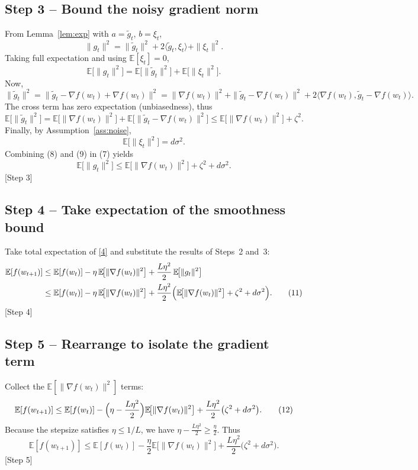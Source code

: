 \documentclass{article}
\newcommand{\E}{\mathbb{E}}
\begin{document}
\subsection*{Step 3 – Bound the noisy gradient norm}
From Lemma~\ref{lem:exp} with $a=\tilde g_t$, $b=\xi_t$,
\[
\|g_t\|^2 = \|\tilde g_t\|^2 + 2\langle\tilde g_t,\xi_t\rangle +\|\xi_t\|^2 .
\] 
Taking full expectation and using $\E[\xi_t]=0$,
\[
\E\!\bigl[\|g_t\|^2\bigr]
   = \E\!\bigl[\|\tilde g_t\|^2\bigr] + \E\!\bigl[\|\xi_t\|^2\bigr] . \tag{7}
\] 
Now,
\[
\|\tilde g_t\|^2 = \|\tilde g_t-\nabla f(w_t)+\nabla f(w_t)\|^2
                = \|\nabla f(w_t)\|^2
                  +\|\tilde g_t-\nabla f(w_t)\|^2
                  +2\langle\nabla f(w_t),\tilde g_t-\nabla f(w_t)\rangle .
\] 
The cross term has zero expectation (unbiasedness), thus
\[
\E\!\bigl[\|\tilde g_t\|^2\bigr]
   = \E\!\bigl[\|\nabla f(w_t)\|^2\bigr]
     +\E\!\bigl[\|\tilde g_t-\nabla f(w_t)\|^2\bigr]
   \le \E\!\bigl[\|\nabla f(w_t)\|^2\bigr] + \zeta^{2}.          \tag{8}
\] 
Finally, by Assumption~\ref{ass:noise},
\[
\E\!\bigl[\|\xi_t\|^2\bigr]=d\sigma^{2}.                        \tag{9}
\] 
Combining (8) and (9) in (7) yields
\[
\E\!\bigl[\|g_t\|^2\bigr]
   \le \E\!\bigl[\|\nabla f(w_t)\|^2\bigr] + \zeta^{2}+d\sigma^{2}. \tag{10}
\] 
[Step 3]

\subsection*{Step 4 – Take expectation of the smoothness bound}
Take total expectation of \eqref{4} and substitute the results of
Steps~2 and~3:
\begin{align}
\E[f(w_{t+1})]
&\le \E[f(w_t)]
   -\eta\,\E\!\bigl[\|\nabla f(w_t)\|^2\bigr]
   +\frac{L\eta^{2}}{2}\,
      \E\!\bigl[\|g_t\|^2\bigr]                                     \nonumber\\
&\le \E[f(w_t)]
   -\eta\,\E\!\bigl[\|\nabla f(w_t)\|^2\bigr]
   +\frac{L\eta^{2}}{2}
      \Bigl(\E\!\bigl[\|\nabla f(w_t)\|^2\bigr] +\zeta^{2}+d\sigma^{2}\Bigr). \tag{11}
\end{align}
[Step 4]

\subsection*{Step 5 – Rearrange to isolate the gradient term}
Collect the $\E[\|\nabla f(w_t)\|^2]$ terms:
\[
\E[f(w_{t+1})]
\le \E[f(w_t)]
   -\Bigl(\eta-\frac{L\eta^{2}}{2}\Bigr)
      \E\!\bigl[\|\nabla f(w_t)\|^2\bigr]
   +\frac{L\eta^{2}}{2}\bigl(\zeta^{2}+d\sigma^{2}\bigr).          \tag{12}
\] 
Because the stepsize satisfies $\eta\le 1/L$, we have
$\eta-\frac{L\eta^{2}}{2}\ge \frac{\eta}{2}$.
Thus
\[
\E[f(w_{t+1})]
\le \E[f(w_t)]
   -\frac{\eta}{2}\E\!\bigl[\|\nabla f(w_t)\|^2\bigr]
   +\frac{L\eta^{2}}{2}\bigl(\zeta^{2}+d\sigma^{2}\bigr).          \tag{13}
\] 
[Step 5]
\end{document}
